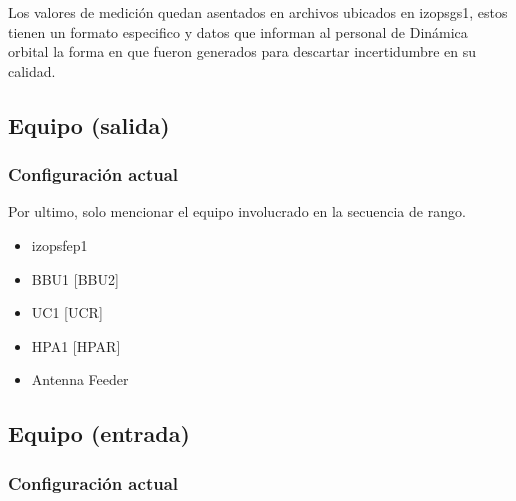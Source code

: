 \documentclass[11pt]{article}
\providecommand{\tightlist}{%
      \setlength{\itemsep}{0pt}\setlength{\parskip}{0pt}}
\begin{document}
    Los valores de medición quedan asentados en archivos ubicados en
izopsgs1, estos tienen un formato especifico y datos que informan al
personal de Dinámica orbital la forma en que fueron generados para
descartar incertidumbre en su calidad.

    \hypertarget{equipo-salida}{%
\subsection{Equipo (salida)}\label{equipo-salida}}

\hypertarget{configuraciuxf3n-actual}{%
\subsubsection{Configuración actual}\label{configuraciuxf3n-actual}}

    Por ultimo, solo mencionar el equipo involucrado en la secuencia de
rango.

    \begin{itemize}
\tightlist
\item
  izopsfep1
\end{itemize}

    \begin{itemize}
\tightlist
\item
  BBU1 {[}BBU2{]}
\end{itemize}

    \begin{itemize}
\tightlist
\item
  UC1 {[}UCR{]}
\end{itemize}

    \begin{itemize}
\tightlist
\item
  HPA1 {[}HPAR{]}
\end{itemize}

    \begin{itemize}
\tightlist
\item
  Antenna Feeder
\end{itemize}

    \hypertarget{equipo-entrada}{%
\subsection{Equipo (entrada)}\label{equipo-entrada}}

\hypertarget{configuraciuxf3n-actual}{%
\subsubsection{Configuración actual}\label{configuraciuxf3n-actual}}
\end{document}
